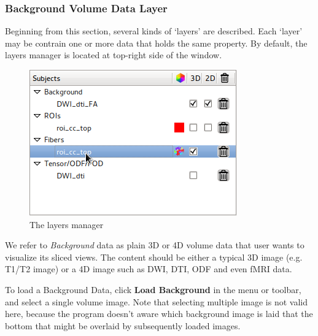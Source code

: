 \documentclass[letterpaper,10pt,english]{sphinxmanual}
\begin{document}
\subsubsection{Background Volume Data Layer}
\label{visualization:background-volume-data-layer}
Beginning from this section, several kinds of `layers' are described.
Each `layer' may be contrain one or more data that holds the same property.
By default, the layers manager is located at top-right side of the window.
\begin{figure}[htbp]
\centering
\capstart

\includegraphics{overlaymgr.png}
\caption{The layers manager}\end{figure}

We refer to \emph{Background} data as plain 3D or 4D volume data that user wants to visualize
its sliced views.
The content should be either a typical 3D image (e.g. T1/T2 image) or a 4D image
such as DWI, DTI, ODF and even fMRI data.

To load a Background Data, click \textbf{Load Background} in the menu or toolbar,
and select a single volume image.
Note that selecting multiple image is not valid here, because the program
doesn't aware which background image is laid that the bottom that might be
overlaid by subsequently loaded images.
\end{document}

